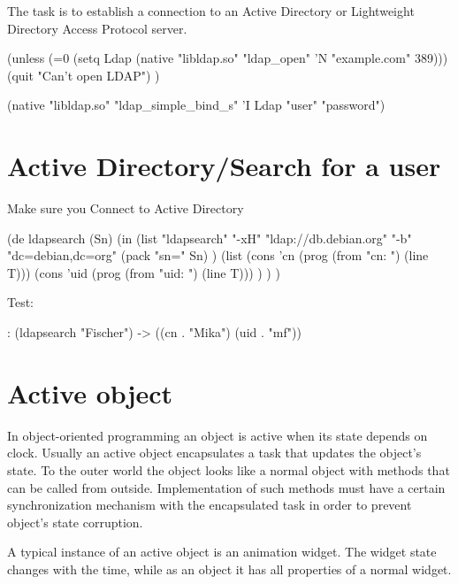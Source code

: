 The task is to establish a connection to an Active Directory or
Lightweight Directory Access Protocol server.

\begin{wideverbatim}

(unless (=0 (setq Ldap (native "libldap.so" "ldap_open" 'N "example.com" 389)))
   (quit "Can't open LDAP") )

(native "libldap.so" "ldap_simple_bind_s" 'I Ldap "user" "password")

\end{wideverbatim}

\pagebreak{}
\section*{Active Directory/Search for a user}

Make sure you Connect to Active Directory

\begin{wideverbatim}

(de ldapsearch (Sn)
   (in
      (list "ldapsearch" "-xH" "ldap://db.debian.org"
         "-b" "dc=debian,dc=org"
         (pack "sn=" Sn) )
      (list
         (cons 'cn (prog (from "cn: ") (line T)))
         (cons 'uid (prog (from "uid: ") (line T))) ) ) )

Test:

: (ldapsearch "Fischer")
-> ((cn . "Mika") (uid . "mf"))

\end{wideverbatim}

\pagebreak{}
\section*{Active object}

In object-oriented programming an object is active when its state
depends on clock. Usually an active object encapsulates a task that
updates the object's state. To the outer world the object looks like a
normal object with methods that can be called from outside.
Implementation of such methods must have a certain synchronization
mechanism with the encapsulated task in order to prevent object's
state corruption.

A typical instance of an active object is an animation widget. The
widget state changes with the time, while as an object it has all
properties of a normal widget.


